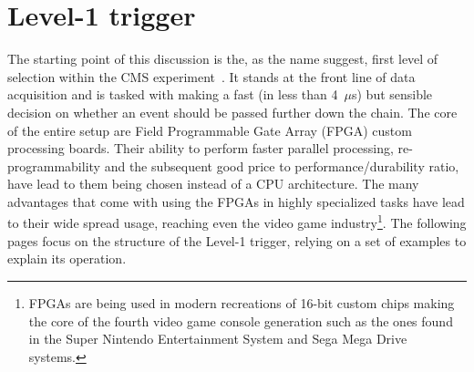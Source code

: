  \section{Level-1 trigger}
 \hspace{10pt} The starting point of this discussion is the, as the name suggest, first level of selection within the CMS experiment~\cite{cms:l1_paper}. It stands at the front line of data acquisition and is tasked with making a fast (in less than 4~$\mu$s) but sensible decision on whether an event should be passed further down the chain. The core of the entire setup are Field Programmable Gate Array (FPGA) custom processing boards. Their ability to perform faster parallel processing, re-programmability and the subsequent good price to performance/durability ratio, have lead to them being chosen instead of a CPU architecture. The many advantages that come with using the FPGAs in highly specialized tasks have lead to their wide spread usage, reaching even the video game industry\footnote{FPGAs are being used in modern recreations of 16-bit custom chips making the core of the fourth video game console generation such as the ones found in the Super Nintendo Entertainment System and Sega Mega Drive systems.}. The following pages focus on the structure of the Level-1 trigger, relying on a set of examples to explain its operation.
 
